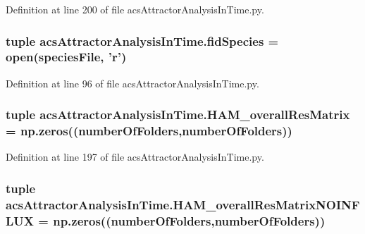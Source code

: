 Definition at line 200 of file acs\+Attractor\+Analysis\+In\+Time.\+py.

\hypertarget{a00125_a70d70b9ab98e722475b03465c7f8dbbe}{
\subsubsection[{fid\+Species}]{\setlength{\rightskip}{0pt plus 5cm}tuple acs\+Attractor\+Analysis\+In\+Time.\+fid\+Species = open({\bf species\+File}, '{\bf r}')}}\label{a00125_a70d70b9ab98e722475b03465c7f8dbbe}


Definition at line 96 of file acs\+Attractor\+Analysis\+In\+Time.\+py.

\hypertarget{a00125_a5e8d5d65865736555e76c3f04058ddd9}{
\subsubsection[{H\+A\+M\+\_\+overall\+Res\+Matrix}]{\setlength{\rightskip}{0pt plus 5cm}tuple acs\+Attractor\+Analysis\+In\+Time.\+H\+A\+M\+\_\+overall\+Res\+Matrix = np.\+zeros(({\bf number\+Of\+Folders},{\bf number\+Of\+Folders}))}}\label{a00125_a5e8d5d65865736555e76c3f04058ddd9}


Definition at line 197 of file acs\+Attractor\+Analysis\+In\+Time.\+py.

\hypertarget{a00125_a6ea74abf4c94200ed1b27d892ecacc97}{
\subsubsection[{H\+A\+M\+\_\+overall\+Res\+Matrix\+N\+O\+I\+N\+F\+L\+U\+X}]{\setlength{\rightskip}{0pt plus 5cm}tuple acs\+Attractor\+Analysis\+In\+Time.\+H\+A\+M\+\_\+overall\+Res\+Matrix\+N\+O\+I\+N\+F\+L\+U\+X = np.\+zeros(({\bf number\+Of\+Folders},{\bf number\+Of\+Folders}))}}\label{a00125_a6ea74abf4c94200ed1b27d892ecacc97}


